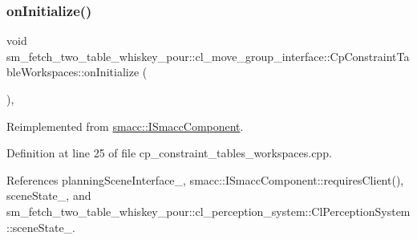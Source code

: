 \subsubsection{\texorpdfstring{on\+Initialize()}{onInitialize()}}
{\footnotesize\ttfamily void sm\+\_\+fetch\+\_\+two\+\_\+table\+\_\+whiskey\+\_\+pour\+::cl\+\_\+move\+\_\+group\+\_\+interface\+::\+Cp\+Constraint\+Table\+Workspaces\+::on\+Initialize (\begin{DoxyParamCaption}{ }\end{DoxyParamCaption})\hspace{0.3cm}{\ttfamily [override]}, {\ttfamily [virtual]}}



Reimplemented from \hyperlink{classsmacc_1_1ISmaccComponent_ae6f71d008db12553912e9436184b9e65}{smacc\+::\+I\+Smacc\+Component}.



Definition at line 25 of file cp\+\_\+constraint\+\_\+tables\+\_\+workspaces.\+cpp.



References planning\+Scene\+Interface\+\_\+, smacc\+::\+I\+Smacc\+Component\+::requires\+Client(), scene\+State\+\_\+, and sm\+\_\+fetch\+\_\+two\+\_\+table\+\_\+whiskey\+\_\+pour\+::cl\+\_\+perception\+\_\+system\+::\+Cl\+Perception\+System\+::scene\+State\+\_\+.


